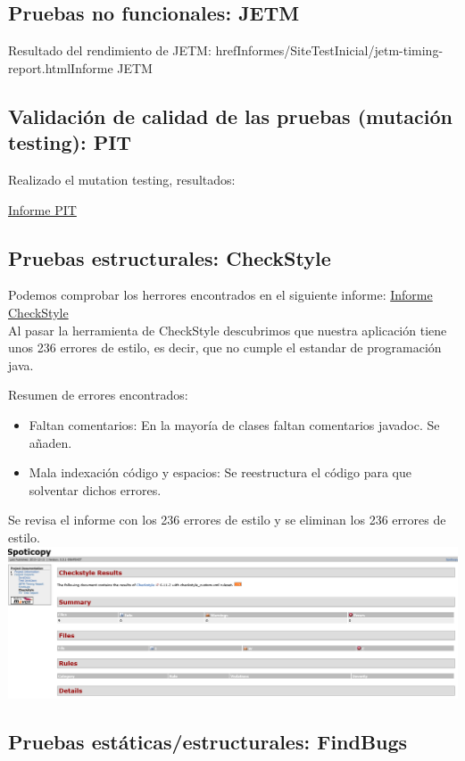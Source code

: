 \documentclass[12pt, a4paper, titlepage]{article}
\begin{document}
	\subsection{Pruebas no funcionales: JETM}
	Resultado del rendimiento de JETM:
	href{Informes/SiteTestInicial/jetm-timing-report.html}{Informe JETM} \\
	
	
	\subsection{Validación de calidad de las pruebas (mutación testing): PIT}
	Realizado el mutation testing, resultados:
	
	\href{Informes/PIT1/index.html}{Informe PIT} \\
	
	\subsection{Pruebas estructurales: CheckStyle}
	Podemos comprobar los herrores encontrados en el siguiente informe: \href{Informes/SiteTestInicial/checkstyle.html}{Informe CheckStyle} \\
	Al pasar la herramienta de CheckStyle descubrimos que nuestra aplicación tiene unos 236 errores de estilo, es decir, que no cumple el estandar de programación java.
	
	Resumen de errores encontrados:
	\begin{itemize}
		\item Faltan comentarios: En la mayoría de clases faltan comentarios javadoc. Se añaden.
		\item Mala indexación código y espacios: Se reestructura el código para que solventar dichos errores.
		\end{itemize}
		
		Se revisa el informe con los 236 errores de estilo y se eliminan los 236 errores de estilo.
		\includegraphics[width=15cm]{Imagenes/CheckStyleResut.png} \\
	\subsection{Pruebas estáticas/estructurales: FindBugs}
	
\end{document}
